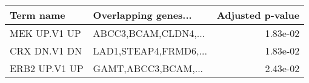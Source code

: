 \begin{tabular}{llr}
\toprule
    Term name &  Overlapping genes... &  Adjusted p-value \\
\midrule
 MEK UP.V1 UP &  ABCC3,BCAM,CLDN4,... &          1.83e-02 \\
 CRX DN.V1 DN & LAD1,STEAP4,FRMD6,... &          1.83e-02 \\
ERB2 UP.V1 UP &   GAMT,ABCC3,BCAM,... &          2.43e-02 \\
\bottomrule
\end{tabular}
